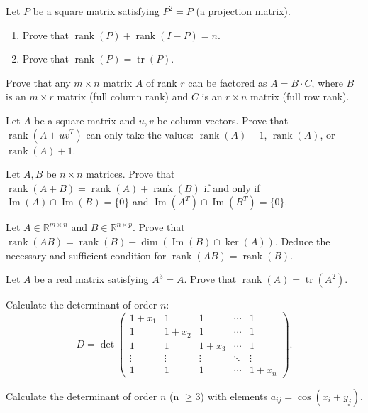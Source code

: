 \documentclass[12pt]{article}
\begin{document}
\begin{problems}
\item Let $P$ be a square matrix satisfying $P^2=P$ (a projection matrix).
\begin{enumerate}[label=(\alph*)]
\item Prove that $\operatorname{rank}(P)+\operatorname{rank}(I-P)=n$.
\item Prove that $\operatorname{rank}(P)=\operatorname{tr}(P)$.
\end{enumerate}

\item Prove that any $m\times n$ matrix $A$ of rank $r$ can be factored as $A=B\cdot C$, where $B$ is an $m\times r$ matrix (full column rank) and $C$ is an $r\times n$ matrix (full row rank).

\item Let $A$ be a square matrix and $u,v$ be column vectors. Prove that $\operatorname{rank}(A+uv^T)$ can only take the values: $\operatorname{rank}(A)-1$, $\operatorname{rank}(A)$, or $\operatorname{rank}(A)+1$.

\item Let $A,B$ be $n\times n$ matrices. Prove that $\operatorname{rank}(A+B)=\operatorname{rank}(A)+\operatorname{rank}(B)$ if and only if $\operatorname{Im}(A)\cap \operatorname{Im}(B)=\{0\}$ and $\operatorname{Im}(A^T)\cap \operatorname{Im}(B^T)=\{0\}$.

\item Let $A\in\mathbb{R}^{m\times n}$ and $B\in\mathbb{R}^{n\times p}$. Prove that $\operatorname{rank}(AB)=\operatorname{rank}(B)-\dim(\operatorname{Im}(B)\cap \ker(A))$. Deduce the necessary and sufficient condition for $\operatorname{rank}(AB)=\operatorname{rank}(B)$.

\item Let $A$ be a real matrix satisfying $A^3=A$. Prove that $\operatorname{rank}(A)=\operatorname{tr}(A^2)$.

\item Calculate the determinant of order $n$:
\[
D = \det\begin{pmatrix}
1+x_1 & 1 & 1 & \cdots & 1\\
1 & 1+x_2 & 1 & \cdots & 1\\
1 & 1 & 1+x_3 & \cdots & 1\\
\vdots & \vdots & \vdots & \ddots & \vdots\\
1 & 1 & 1 & \cdots & 1+x_n
\end{pmatrix}.
\]

\item Calculate the determinant of order $n$ (n $\ge 3$) with elements $a_{ij}=\cos(x_i+y_j)$.


\end{problems}
\end{document}
